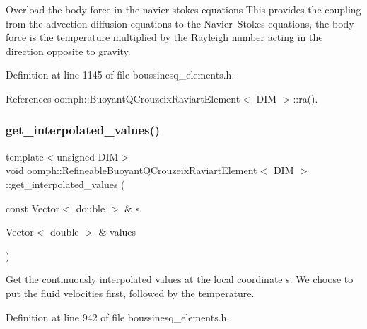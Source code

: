 Overload the body force in the navier-\/stokes equations This provides the coupling from the advection-\/diffusion equations to the Navier--Stokes equations, the body force is the temperature multiplied by the Rayleigh number acting in the direction opposite to gravity. 



Definition at line 1145 of file boussinesq\+\_\+elements.\+h.



References oomph\+::\+Buoyant\+Q\+Crouzeix\+Raviart\+Element$<$ D\+I\+M $>$\+::ra().

\mbox{\label{classoomph_1_1RefineableBuoyantQCrouzeixRaviartElement_aa89e116d612b3530edd2b0666d25cf01}} 
\subsubsection{\texorpdfstring{get\+\_\+interpolated\+\_\+values()}{get\_interpolated\_values()}\hspace{0.1cm}{\footnotesize\ttfamily [1/2]}}
{\footnotesize\ttfamily template$<$unsigned D\+IM$>$ \\
void \hyperlink{classoomph_1_1RefineableBuoyantQCrouzeixRaviartElement}{oomph\+::\+Refineable\+Buoyant\+Q\+Crouzeix\+Raviart\+Element}$<$ D\+IM $>$\+::get\+\_\+interpolated\+\_\+values (\begin{DoxyParamCaption}\item[{const Vector$<$ double $>$ \&}]{s,  }\item[{Vector$<$ double $>$ \&}]{values }\end{DoxyParamCaption})\hspace{0.3cm}{\ttfamily [inline]}}



Get the continuously interpolated values at the local coordinate s. We choose to put the fluid velocities first, followed by the temperature. 



Definition at line 942 of file boussinesq\+\_\+elements.\+h.

